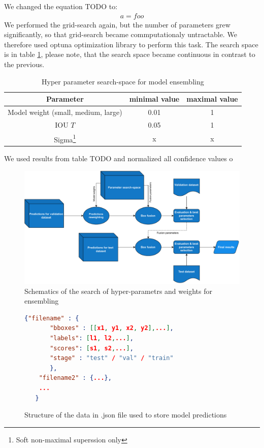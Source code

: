 We changed the equation TODO to:
\begin{align}
    a = foo
\end{align}
We performed the grid-search again, but the number of parameters grew significantly, so that grid-search became commputationaly untractable. We therefore used optuna optimization library to perform this task. The search space is in table \ref{tab:ensembling_search_space_area}, please note, that the search space became continuous in contrast to the previous.

\begin{table}
    \centering
    \begin{tabular}{|c|c|c|}
        Parameter                                         & minimal value & maximal value \\ \hline
        Model weight (small, medium, large)               & 0.01          & 1             \\ \hline
        IOU $T$                                           & 0.05          & 1             \\ \hline
        Sigma\footnote{Soft non-maximal superssion only } & x             & x             \\ \hline
    \end{tabular}
    \caption{Hyper parameter search-space for model ensembling}
    \label{tab:ensembling_search_space_area}
\end{table}

We used results from table TODO and normalized all confidence values o
\begin{figure}
    \centering
    \includegraphics[width=\linewidth]{images/ensemble_search_diag.drawio.pdf}
    \caption{Schematics of the search of hyper-parametrs and weights for ensembling}
    \label{fig:diag:ense_search}
\end{figure}

\begin{figure}
    \centering
    \begin{lstlisting}[language=json, numbers=none]
   {"filename" : {
       "bboxes" : [[x1, y1, x2, y2],...],
       "labels": [l1, l2,...],
       "scores": [s1, s2,...],
       "stage" : "test" / "val" / "train"
       },
    "filename2" : {...},
    ...
   }
\end{lstlisting}
    \caption{Structure of the data in .json file used to store model predictions}
    \label{fig:predictions_json}
\end{figure}